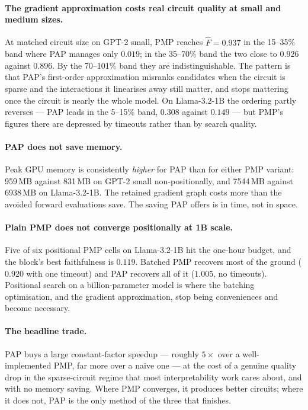 \documentclass[11pt,a4paper]{article}
\begin{document}
\paragraph{The gradient approximation costs real circuit quality at small and medium sizes.}
At matched circuit size on GPT-2 small, PMP reaches $\widehat{F} = 0.937$ in the 15--35\% band
where PAP manages only $0.019$; in the 35--70\% band the two close to $0.926$ against $0.896$.
By the 70--101\% band they are indistinguishable. The pattern is that PAP's first-order
approximation misranks candidates when the circuit is sparse and the interactions it linearises
away still matter, and stops mattering once the circuit is nearly the whole model. On
Llama-3.2-1B the ordering partly reverses --- PAP leads in the 5--15\% band, $0.308$ against
$0.149$ --- but PMP's figures there are depressed by timeouts rather than by search quality.

\paragraph{PAP does not save memory.}
Peak GPU memory is consistently \emph{higher} for PAP than for either PMP variant: 959\,MB
against 831\,MB on GPT-2 small non-positionally, and 7544\,MB against 6938\,MB on
Llama-3.2-1B. The retained gradient graph costs more than the avoided forward evaluations save.
The saving PAP offers is in time, not in space.

\paragraph{Plain PMP does not converge positionally at 1B scale.}
Five of six positional PMP cells on Llama-3.2-1B hit the one-hour budget, and the block's best
faithfulness is $0.119$. Batched PMP recovers most of the ground ($0.920$ with one timeout) and
PAP recovers all of it ($1.005$, no timeouts). Positional search on a billion-parameter model is
where the batching optimisation, and the gradient approximation, stop being conveniences and
become necessary.

\paragraph{The headline trade.}
PAP buys a large constant-factor speedup --- roughly $5\times$ over a well-implemented PMP, far
more over a naive one --- at the cost of a genuine quality drop in the sparse-circuit regime
that most interpretability work cares about, and with no memory saving. Where PMP converges, it
produces better circuits; where it does not, PAP is the only method of the three that finishes.
\end{document}

